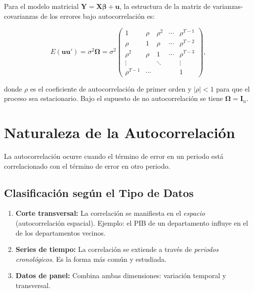 \documentclass[12pt,a4paper]{article}
\theoremstyle{definition}
\theoremstyle{remark}
\begin{document}
Para el modelo matricial $\mathbf{Y} = \mathbf{X}\boldsymbol{\beta} +
\mathbf{u}$, la estructura de la matriz de varianzas-covarianzas de los
errores bajo autocorrelación es:

\begin{equation}
  E(\mathbf{u}\mathbf{u}') = \sigma^2\boldsymbol{\Omega} =
  \sigma^2
  \begin{pmatrix}
    1      & \rho   & \rho^2 & \cdots & \rho^{T-1} \\
    \rho   & 1      & \rho   & \cdots & \rho^{T-2} \\
    \rho^2 & \rho   & 1      & \cdots & \rho^{T-3} \\
    \vdots &        & \ddots &        & \vdots      \\
    \rho^{T-1} & \cdots & & & 1
  \end{pmatrix},
  \label{eq:omega}
\end{equation}

donde $\rho$ es el coeficiente de autocorrelación de primer orden y
$|\rho| < 1$ para que el proceso sea estacionario. Bajo el supuesto de
no autocorrelación se tiene $\boldsymbol{\Omega} = \mathbf{I}_n$.

\section{Naturaleza de la Autocorrelación}
\label{sec:naturaleza}

La autocorrelación ocurre cuando el término de error en un periodo está
correlacionado con el término de error en otro periodo.

\subsection{Clasificación según el Tipo de Datos}

\begin{enumerate}[label=\textbf{\arabic*.}, leftmargin=2em, itemsep=6pt]
  \item \textbf{Corte transversal:} La correlación se manifiesta en el
        \emph{espacio} (autocorrelación espacial). Ejemplo: el PIB de un
        departamento influye en el de los departamentos vecinos.
  \item \textbf{Series de tiempo:} La correlación se extiende a través
        de \emph{periodos cronológicos}. Es la forma más común y estudiada.
  \item \textbf{Datos de panel:} Combina ambas dimensiones: variación
        temporal y transversal.
\end{enumerate}
\end{document}
